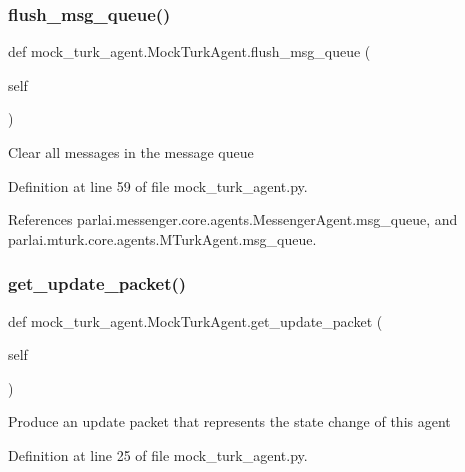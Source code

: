 \subsubsection{\texorpdfstring{flush\+\_\+msg\+\_\+queue()}{flush\_msg\_queue()}}
{\footnotesize\ttfamily def mock\+\_\+turk\+\_\+agent.\+Mock\+Turk\+Agent.\+flush\+\_\+msg\+\_\+queue (\begin{DoxyParamCaption}\item[{}]{self }\end{DoxyParamCaption})}

\begin{DoxyVerb}Clear all messages in the message queue\end{DoxyVerb}
 

Definition at line 59 of file mock\+\_\+turk\+\_\+agent.\+py.



References parlai.\+messenger.\+core.\+agents.\+Messenger\+Agent.\+msg\+\_\+queue, and parlai.\+mturk.\+core.\+agents.\+M\+Turk\+Agent.\+msg\+\_\+queue.

\mbox{\label{classmock__turk__agent_1_1MockTurkAgent_a4e5f98ce759842f8fadad41360b1d67b}} 
\subsubsection{\texorpdfstring{get\+\_\+update\+\_\+packet()}{get\_update\_packet()}}
{\footnotesize\ttfamily def mock\+\_\+turk\+\_\+agent.\+Mock\+Turk\+Agent.\+get\+\_\+update\+\_\+packet (\begin{DoxyParamCaption}\item[{}]{self }\end{DoxyParamCaption})}

\begin{DoxyVerb}Produce an update packet that represents the state change
of this agent\end{DoxyVerb}
 

Definition at line 25 of file mock\+\_\+turk\+\_\+agent.\+py.




